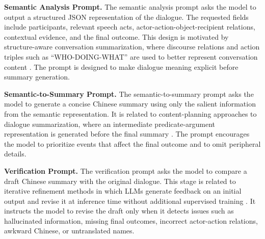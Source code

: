 \documentclass[11pt]{article}
\begin{document}
\medskip
\noindent\textbf{Semantic Analysis Prompt.}
The semantic analysis prompt asks the model to output a structured JSON
representation of the dialogue. The requested fields include participants,
relevant speech acts, actor-action-object-recipient relations, contextual
evidence, and the final outcome. This design is motivated by structure-aware
conversation summarization, where discourse relations and action triples such as
``WHO-DOING-WHAT'' are used to better represent conversation content
\citep{chen-yang-2021-structure}. The prompt is designed to make dialogue
meaning explicit before summary generation.

\medskip
\noindent\textbf{Semantic-to-Summary Prompt.}
The semantic-to-summary prompt asks the model to generate a concise Chinese
summary using only the salient information from the semantic representation. It
is related to content-planning approaches to dialogue summarization, where an
intermediate predicate-argument representation is generated before the final
summary \citep{wang-etal-2022-guiding}. The prompt encourages the model to
prioritize events that affect the final outcome and to omit peripheral details.

\medskip
\noindent\textbf{Verification Prompt.}
The verification prompt asks the model to compare a draft Chinese summary with
the original dialogue. This stage is related to iterative refinement methods in
which LLMs generate feedback on an initial output and revise it at inference
time without additional supervised training \citep{madaan-etal-2023-self-refine}.
It instructs the model to revise the draft only when it detects issues such as
hallucinated information, missing final outcomes, incorrect actor-action
relations, awkward Chinese, or untranslated names.
\end{document}
